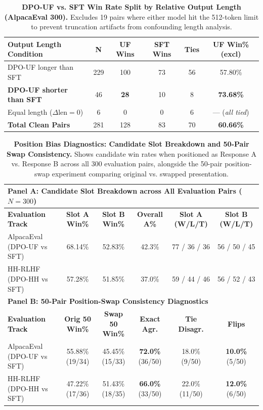 \documentclass[11pt,a4paper]{article}
\begin{document}
\begin{table}[t]
\centering
\scriptsize
\setlength{\tabcolsep}{3pt}
\renewcommand{\arraystretch}{0.88}
\caption{\textbf{DPO-UF vs. SFT Win Rate Split by Relative Output Length (AlpacaEval 300).} Excludes 19 pairs where either model hit the 512-token limit to prevent truncation artifacts from confounding length analysis.}
\label{tab:length_split}
\begin{tabularx}{\columnwidth}{Xccccc}
\toprule
\textbf{Output Length Condition} & \textbf{N} & \textbf{UF Wins} & \textbf{SFT Wins} & \textbf{Ties} & \textbf{UF Win\% (excl)} \\
\midrule
DPO-UF longer than SFT & 229 & 100 & 73 & 56 & 57.80\% \\
\textbf{DPO-UF shorter than SFT} & 46 & \textbf{28} & 10 & 8 & \textbf{73.68\%} \\
Equal length ($\Delta \text{len} = 0$) & 6 & 0 & 0 & 6 & --- (\textit{all tied}) \\
\midrule
\textbf{Total Clean Pairs} & 281 & 128 & 83 & 70 & \textbf{60.66\%} \\
\bottomrule
\end{tabularx}
\end{table}
\begin{table}[t]
\centering
\scriptsize
\setlength{\tabcolsep}{2.5pt}
\renewcommand{\arraystretch}{0.88}
\caption{\textbf{Position Bias Diagnostics: Candidate Slot Breakdown and 50-Pair Swap Consistency.} Shows candidate win rates when positioned as Response A vs. Response B across all 300 evaluation pairs, alongside the 50-pair position-swap experiment comparing original vs. swapped presentation.}
\label{tab:position_bias}
\begin{tabularx}{\textwidth}{lccccc}
\toprule
\multicolumn{6}{l}{\textbf{Panel A: Candidate Slot Breakdown across All Evaluation Pairs ($N=300$)}} \\
\midrule
\textbf{Evaluation Track} & \textbf{Slot A Win\%} & \textbf{Slot B Win\%} & \textbf{Overall A\%} & \textbf{Slot A (W/L/T)} & \textbf{Slot B (W/L/T)} \\
AlpacaEval (DPO-UF vs SFT) & 68.14\% & 52.83\% & 42.3\% & 77 / 36 / 36 & 56 / 50 / 45 \\
HH-RLHF (DPO-HH vs SFT) & 57.28\% & 51.85\% & 37.0\% & 59 / 44 / 46 & 56 / 52 / 43 \\
\midrule
\multicolumn{6}{l}{\textbf{Panel B: 50-Pair Position-Swap Consistency Diagnostics}} \\
\midrule
\textbf{Evaluation Track} & \textbf{Orig 50 Win\%} & \textbf{Swap 50 Win\%} & \textbf{Exact Agr.} & \textbf{Tie Disagr.} & \textbf{Flips} \\
AlpacaEval (DPO-UF vs SFT) & 55.88\% (19/34) & 45.45\% (15/33) & \textbf{72.0\%} (36/50) & 18.0\% (9/50) & \textbf{10.0\%} (5/50) \\
HH-RLHF (DPO-HH vs SFT) & 47.22\% (17/36) & 51.43\% (18/35) & \textbf{66.0\%} (33/50) & 22.0\% (11/50) & \textbf{12.0\%} (6/50) \\
\bottomrule
\end{tabularx}
\end{table}
\end{document}
